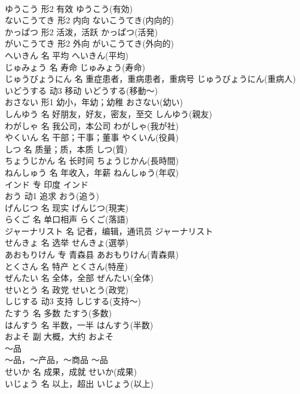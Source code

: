 \documentclass[8pt]{extreport}
\begin{document}
\begin{CJK}{UTF8}{min}
\\	ゆうこう	形2	有效	ゆうこう(有効)	
\\	ないこうてき	形2	内向	ないこうてき(内向的)	
\\	かっぱつ	形2	活泼，活跃	かっぱつ(活発)	
\\	がいこうてき	形2	外向	がいこうてき(外向的)	
\\	へいきん	名	平均	へいきん(平均)	
\\	じゅみょう	名	寿命	じゅみょう(寿命)	
\\	じゅうびょうにん	名	重症患者，重病患者，重病号	じゅうびょうにん(重病人)	
\\	いどうする	动3	移动	いどうする(移動～)	
\\	おさない	形1	幼小，年幼；幼稚	おさない(幼い)	
\\	しんゆう	名	好朋友，好友，密友，至交	しんゆう(親友)	
\\	わがしゃ	名	我公司，本公司	わがしゃ(我が社)	
\\	やくいん	名	干部；干事；董事	やくいん(役員)	
\\	しつ	名	质量；质，本质	しつ(質)	
\\	ちょうじかん	名	长时间	ちょうじかん(長時間)	
\\	ねんしゅう	名	年收入，年薪	ねんしゅう(年収)	
\\	インド	专	印度	インド	
\\	おう	动1	追求	おう(追う)	
\\	げんじつ	名	现实	げんじつ(現実)	
\\	らくご	名	单口相声	らくご(落語)	
\\	ジャーナリスト	名	记者，编辑，通讯员	ジャーナリスト	
\\	せんきょ	名	选举	せんきょ(選挙)	
\\	あおもりけん	专	青森县	あおもりけん(青森県)	
\\	とくさん	名	特产	とくさん(特産)	
\\	ぜんたい	名	全体，全部	ぜんたい(全体)	
\\	せいとう	名	政党	せいとう(政党)	
\\	しじする	动3	支持	しじする(支持～)	
\\	たすう	名	多数	たすう(多数)	
\\	はんすう	名	半数，一半	はんすう(半数)	
\\	およそ	副	大概，大约	およそ	
\\	～品	
\\	～品，～产品，～商品	～品	
\\	せいか	名	成果，成就	せいか(成果)	
\\	いじょう	名	以上，超出	いじょう(以上)	

\end{CJK}
\end{document}
